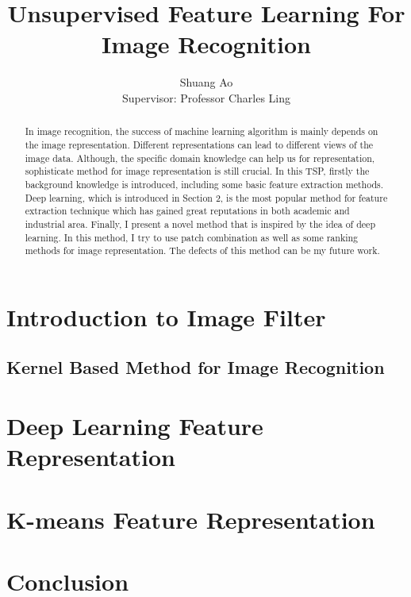 \documentclass[12pt,onecolumn]{article}
\author{Shuang Ao \\
Supervisor: Professor Charles Ling
}
\title{
\large\textbf{Unsupervised Feature Learning For Image Recognition}
}
\begin{document}
\maketitle
\tableofcontents
\newpage
\begin{abstract}
In image recognition, the success of machine learning algorithm is mainly depends on the image representation. Different representations can lead to different views of the image data. Although, the specific domain knowledge can help us for representation, sophisticate method for image representation is still crucial. In this TSP, firstly the background knowledge is introduced, including some basic feature extraction methods. Deep learning, which is introduced in Section 2, is the most popular method for feature extraction technique which has gained great reputations in both academic and industrial area. Finally, I present a novel method that is inspired by the idea of deep learning. In this method, I try to use patch combination as well as some ranking methods for image representation. The defects of this method can be my future work.

\end{abstract}

\section{Introduction to Image Filter}\label{sec:intro}

    \subsection{Kernel Based Method for Image Recognition}

\newpage
\section{Deep Learning Feature Representation}\label{dl}
    
 \newpage
\section{K-means Feature Representation}\label{km}
    
\newpage
\section{Conclusion}
 
\newpage






\end{document}

